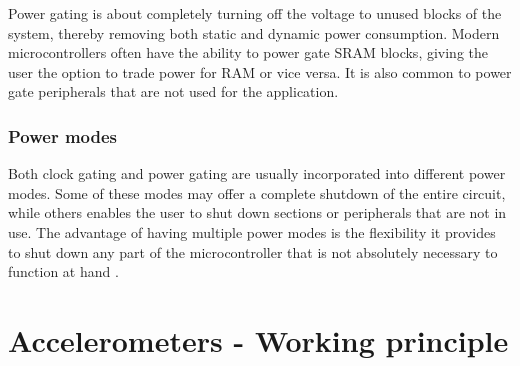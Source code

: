 Power gating is about completely turning off the voltage to unused blocks of the system, thereby removing both static and dynamic power consumption. Modern microcontrollers often have the ability to power gate SRAM blocks, giving the user the option to trade power for RAM or vice versa. It is also common to power gate peripherals that are not used for the application.

\subsubsection{Power modes}

Both clock gating and power gating are usually incorporated into different power modes. Some of these modes may offer a complete shutdown of the entire circuit, while others enables the user to shut down sections or peripherals that are not in use. The advantage of having multiple power modes is the flexibility it provides to shut down any part of the microcontroller that is not absolutely necessary to function at hand \cite[~p.4]{holberg06}.  




\section{Accelerometers - Working principle} \label{sec:accel_working_principle}


